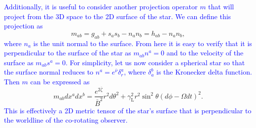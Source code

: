 \documentclass{aa}
\newcommand{\be}{\begin{equation}}
\newcommand{\ee}{\end{equation}}
\newcommand{\red}[1]{\textcolor{red}{#1}}
\newcommand{\refe}[1]{\textcolor{blue}{{#1}}}
\newcommand{\refedel}[1]{}
\newcommand{\nub}{\ensuremath{\bar{\nu}}}
\newcommand{\zetab}{\ensuremath{\bar{\zeta}}}
\newcommand{\Bb}{\ensuremath{\bar{B}}}
\newcommand{\lgamma}{\gamma_{\text{L}}}
\begin{document}
\refe{Additionally, it is useful to consider another projection operator $m$ that will project from the 3D space to the 2D surface of the star.}
\refe{We can define this projection as}
\be\label{eq:2dmetric}
m_{ab} = g_{ab} + s_a s_b - n_a n_b = h_{ab} - n_a n_b,
\ee
\refe{where $n_a$ is the unit normal to the surface.}
\refe{From here it is easy to verify that it is perpendicular to the surface of the star as $m_{ab} n^a = 0$ and to the velocity of the surface as $m_{ab} s^a = 0$.}
\refe{For simplicity, let us now consider a spherical star so that the surface normal reduces to $n^a = e^{\nub} \delta_r^a$, where $\delta_a^b$ is the Kronecker delta function.}
\refe{Then $m$ can be expressed as}
\be
m_{ab} dx^a dx^b = \frac{e^{2\zetab}}{\Bb^2} r^2 d\theta^2 + \lgamma^2 r^2 \sin^2\theta (d\phi - \Omega dt)^2.
\ee
\refe{This is effectively a 2D metric tensor of the star's surface that is perpendicular to the worldline of the co-rotating observer.}
\end{document}
